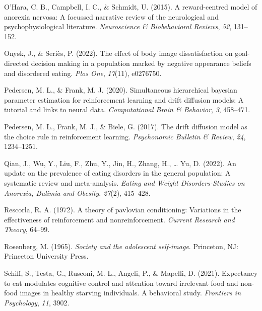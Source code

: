 \documentclass[
  man,floatsintext]{apa6}
\newlength{\cslhangindent}
\newlength{\cslentryspacingunit} %
\newenvironment{CSLReferences}[2] %
 {%
  \setlength{\parindent}{0pt}
  \ifodd #1
  \let\oldpar\par
  \def\par{\hangindent=\cslhangindent\oldpar}
  \fi
  \setlength{\parskip}{#2\cslentryspacingunit}
 }%
 {}
\begin{document}
\begin{CSLReferences}{1}{0}
\leavevmode{}%
O'Hara, C. B., Campbell, I. C., \& Schmidt, U. (2015). A reward-centred model of anorexia nervosa: A focussed narrative review of the neurological and psychophysiological literature. \emph{Neuroscience \& Biobehavioral Reviews}, \emph{52}, 131--152.

\leavevmode{}%
Onysk, J., \& Seriès, P. (2022). The effect of body image dissatisfaction on goal-directed decision making in a population marked by negative appearance beliefs and disordered eating. \emph{Plos One}, \emph{17}(11), e0276750.

\leavevmode{}%
Pedersen, M. L., \& Frank, M. J. (2020). Simultaneous hierarchical bayesian parameter estimation for reinforcement learning and drift diffusion models: A tutorial and links to neural data. \emph{Computational Brain \& Behavior}, \emph{3}, 458--471.

\leavevmode{}%
Pedersen, M. L., Frank, M. J., \& Biele, G. (2017). The drift diffusion model as the choice rule in reinforcement learning. \emph{Psychonomic Bulletin \& Review}, \emph{24}, 1234--1251.

\leavevmode{}%
Qian, J., Wu, Y., Liu, F., Zhu, Y., Jin, H., Zhang, H., \ldots{} Yu, D. (2022). An update on the prevalence of eating disorders in the general population: A systematic review and meta-analysis. \emph{Eating and Weight Disorders-Studies on Anorexia, Bulimia and Obesity}, \emph{27}(2), 415--428.

\leavevmode{}%
Rescorla, R. A. (1972). A theory of pavlovian conditioning: Variations in the effectiveness of reinforcement and nonreinforcement. \emph{Current Research and Theory}, 64--99.

\leavevmode{}%
Rosenberg, M. (1965). \emph{Society and the adolescent self-image}. Princeton, NJ: Princeton University Press.

\leavevmode{}%
Schiff, S., Testa, G., Rusconi, M. L., Angeli, P., \& Mapelli, D. (2021). Expectancy to eat modulates cognitive control and attention toward irrelevant food and non-food images in healthy starving individuals. A behavioral study. \emph{Frontiers in Psychology}, \emph{11}, 3902.


\end{CSLReferences}
\end{document}
